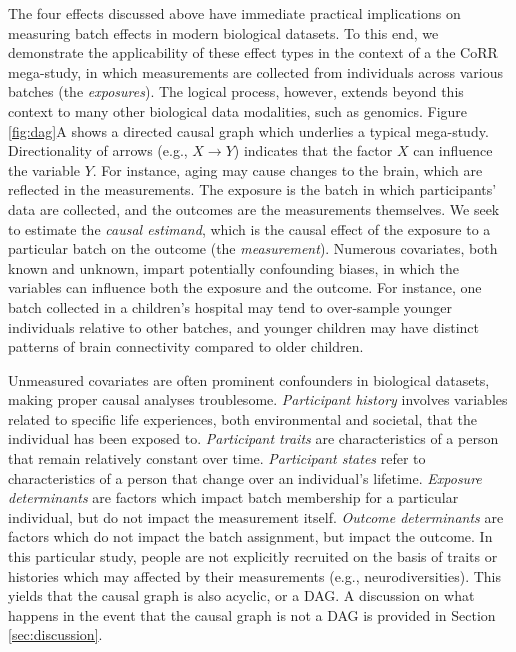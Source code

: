 The four effects discussed above have immediate practical implications on measuring batch effects in modern biological datasets. To this end, we demonstrate the applicability of these effect types in the context of a the CoRR mega-study, in which measurements are collected from individuals across various batches (the \textit{exposures}). The logical process, however, extends beyond this context to many other biological data modalities, such as genomics. Figure \ref{fig:dag}A shows a directed causal graph which underlies a typical mega-study. Directionality of arrows (e.g., $X \rightarrow Y$) indicates that the factor $X$ can influence the variable $Y$. For instance, aging may cause changes to the brain, which are reflected in the measurements. The exposure is the batch in which participants' data are collected, and the outcomes are the measurements themselves. We seek to estimate the \textit{causal estimand}, which is the causal effect of the exposure to a particular batch on the outcome (the \textit{measurement}). Numerous covariates, both known and unknown, impart potentially confounding biases, in which the variables can influence both the exposure and the outcome. For instance, one batch collected in a children's hospital may tend to over-sample younger individuals relative to other batches, and younger children may have distinct patterns of brain connectivity compared to older children. {} 

Unmeasured covariates are often prominent confounders in biological datasets, making proper causal analyses troublesome. \textit{Participant history} involves variables related to specific life experiences, both environmental and societal, that the individual has been exposed to. \textit{Participant traits} are characteristics of a person that remain relatively constant over time. \textit{Participant states} refer to characteristics of a person that change over an individual's lifetime. \textit{Exposure determinants} are factors which impact batch membership for a particular individual, but do not impact the measurement itself. \textit{Outcome determinants} are factors which do not impact the batch assignment, but impact the outcome. In this particular study, people are not explicitly recruited on the basis of traits or histories which may affected by their measurements (e.g., neurodiversities). This yields that the causal graph is also acyclic, or a DAG. A discussion on what happens in the event that the causal graph is not a DAG is provided in Section \ref{sec:discussion}.

